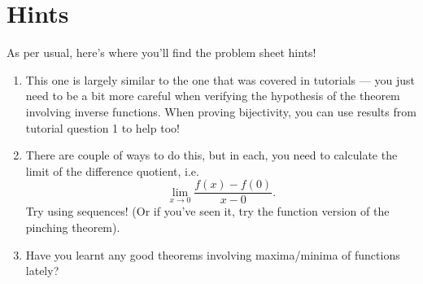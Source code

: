 \documentclass[
  12pt,
  a4paper]{extarticle}
\providecommand{\tightlist}{%
  \setlength{\itemsep}{0pt}\setlength{\parskip}{0pt}}
\theoremstyle{plain}
\theoremstyle{definition}
\theoremstyle{plain}
\theoremstyle{plain}
\theoremstyle{plain}
\theoremstyle{plain}
\theoremstyle{definition}
\theoremstyle{definition}
\theoremstyle{remark}
\theoremstyle{remark}
\renewcommand{\;}{\,}
\begin{document}
\hypertarget{hints}{%
\section{Hints}\label{hints}}

As per usual, here's where you'll find the problem sheet hints!

\begin{enumerate}
\def\labelenumi{\arabic{enumi})}
\tightlist
\item
  This one is largely similar to the one that was covered in tutorials --- you just need to be a bit more careful when verifying the hypothesis of the theorem involving inverse functions. When proving bijectivity, you can use results from tutorial question 1 to help too!
\item
  There are couple of ways to do this, but in each, you need to calculate the limit of the difference quotient, i.e.~\[\lim_{x\to 0 }\frac{f(x) - f(0)}{x - 0}.\] Try using sequences! (Or if you've seen it, try the function version of the pinching theorem).
\item
  Have you learnt any good theorems involving maxima/minima of functions lately?
\end{enumerate}
\end{document}
